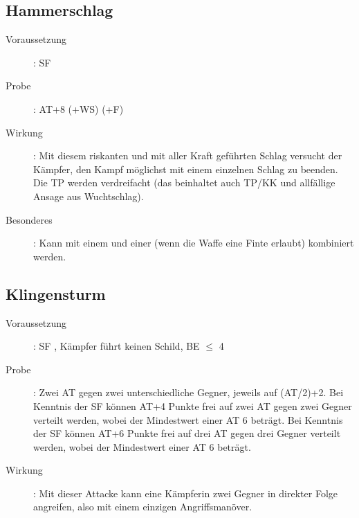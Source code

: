 \subsection{Hammerschlag }
\begin{description}
    \item[Voraussetzung]: SF 
    \item[Probe]: AT+8 (+WS) (+F)
    \item[Wirkung]: Mit diesem riskanten und mit aller Kraft geführten Schlag
        versucht der Kämpfer, den Kampf möglichst mit einem einzelnen Schlag zu
        beenden. Die TP werden verdreifacht (das beinhaltet auch TP/KK und
        allfällige Ansage aus Wuchtschlag).
    \item[Besonderes]: Kann mit einem  und einer
         (wenn die Waffe eine Finte erlaubt) kombiniert
        werden.
\end{description}

\subsection{Klingensturm }
\label{chap.bAT.klingensturm}
\begin{description}
    \item[Voraussetzung]: SF , Kämpfer führt keinen
        Schild, BE\textrm{ ${\leq}$ }4
    \item[Probe]: Zwei AT gegen zwei unterschiedliche Gegner, jeweils auf
        (AT/2)+2.\newline
        Bei Kenntnis der SF  können AT+4 Punkte frei
        auf zwei AT gegen zwei Gegner verteilt werden, wobei der Mindestwert
        einer AT 6 beträgt.\newline
        Bei Kenntnis der SF  können AT+6 Punkte frei
        auf drei AT gegen drei Gegner verteilt werden, wobei der Mindestwert
        einer AT 6 beträgt.
    \item[Wirkung]: Mit dieser Attacke kann eine Kämpferin zwei Gegner in
        direkter Folge angreifen, also mit einem einzigen Angriffsmanöver.
\end{description}

